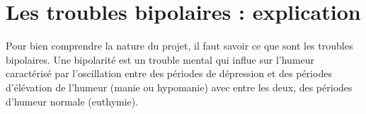 \section{Les troubles bipolaires : explication}

Pour bien comprendre la nature du projet, il faut savoir ce que sont les troubles bipolaires.
Une bipolarité est un trouble mental qui influe sur l'humeur caractérisé par l'oscillation entre des périodes de dépression et des périodes d'élévation de l'humeur (manie ou hypomanie) avec entre les deux,
des périodes d'humeur \og{} normale \fg{} (euthymie).

